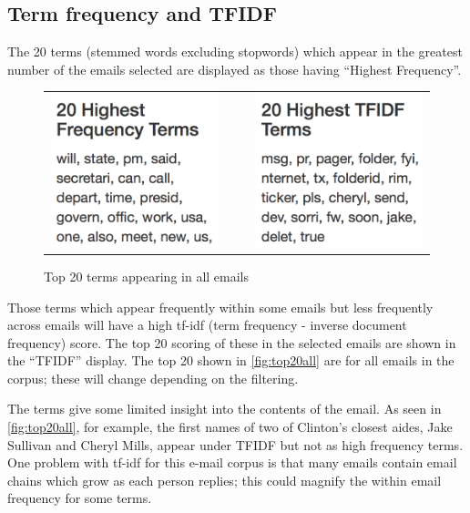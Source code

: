 \documentclass[journal]{vgtc}                %
\begin{document}
\subsection{Term frequency and TFIDF}
\label{sect:Displays:TFIDF}
The 20 terms (stemmed words excluding stopwords) which appear in the greatest number of the emails selected are displayed as those having ``Highest Frequency''.  
\begin{figure}[h]
\begin{center}
\begin{tabular}{ccc}
\includegraphics[width=0.4\linewidth]{HighFreqAll} &
$~~~~$ &
\includegraphics[width=0.4\linewidth]{HighTFIDFAll} 
\end{tabular}
\caption{Top 20 terms appearing in all emails}
\label{fig:top20all}
\end{center}
\end{figure}
Those terms which appear frequently within some emails but less frequently across emails will have a high tf-idf (term frequency - inverse document frequency) score.  The top 20 scoring of these in the selected emails are shown in the ``TFIDF'' display. 
The top 20 shown in \autoref{fig:top20all} are for all emails in the corpus; these will change depending on the filtering.

The terms give some limited insight into the contents of the email.  As seen in \autoref{fig:top20all}, for example, the first names of two of Clinton's closest aides, Jake Sullivan and Cheryl Mills,  appear under TFIDF but not  as high frequency terms.  One problem with tf-idf for this e-mail corpus is that many emails contain email chains which grow as each person replies; this could magnify the within email frequency for some terms.
\end{document}
